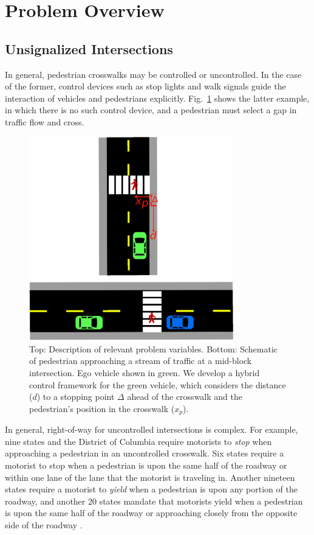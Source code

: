 \documentclass[letterpaper, 10 pt, conference]{ieeeconf}  %
\begin{document}
\section{Problem Overview}

\subsection{Unsignalized Intersections}

In general, pedestrian crosswalks may be controlled or uncontrolled. In the case of the former, control devices such as stop lights and walk signals guide the interaction of vehicles and pedestrians explicitly. Fig.~\ref{fig:schematic} shows the latter example, in which there is no such control device, and a pedestrian must select a gap in traffic flow and cross.   

\begin{figure}
\centering
\includegraphics[width=3.5in]{figures/example2.eps}
\caption{Top: Description of relevant problem variables. Bottom: Schematic of pedestrian approaching a stream of traffic at a mid-block intersection. Ego vehicle shown in green. We develop a hybrid control framework for the green vehicle, which considers the distance ($d$) to a stopping point $\Delta$ ahead of the crosswalk and the pedestrian's position in the crosswalk ($x_p$).}
\label{fig:schematic}
\end{figure}

In general, right-of-way for uncontrolled intersections is complex. For example, nine states and the District of Columbia require motorists to \textit{stop} when approaching a pedestrian in an uncontrolled crosswalk. Six states require a motorist to stop when a pedestrian is upon the same half of the roadway or within one lane of the lane that the motorist is traveling in. Another nineteen states require a motorist to \textit{yield} when a pedestrian is upon any portion of the roadway, and another 20 states mandate that motorists yield when a pedestrian is upon the same half of the roadway or approaching closely from the opposite side of the roadway \cite{Legislatures2018}.
\end{document}
